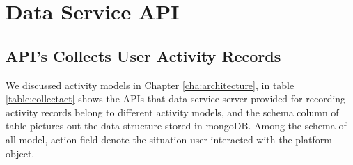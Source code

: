 \section{Data Service API}
\subsection{API's Collects User Activity Records}
We discussed activity models in Chapter \ref{cha:architecture}, in table \ref{table:collectact} shows the APIs that data service server provided for recording activity records belong to different activity models, and the schema column of table pictures out the data structure stored in mongoDB.
Among the schema of all model, action field denote the situation user interacted with the platform object.

